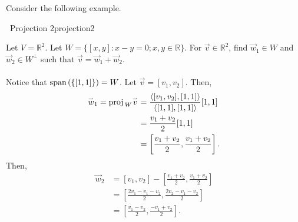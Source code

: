         \pagebreak
        \vphantom
        \\
        \\
        Consider the following example.
        \begin{example}{\Difficulty\,\Difficulty\,\,Projection 2}{projection2}

            Let \(V=\mathbb{R}^2\). Let \(W=\{[x,y]:x-y=0;x,y\in\mathbb{R}\}\). For \(\vec{v}\in\mathbb{R}^2\), find \(\vec{w}_1\in W\) and \(\vec{w}_2\in W^\perp\) such that \(\vec{v}=\vec{w}_1+\vec{w}_2\).
            \\
            \\
            Notice that \(\text{span\,}(\{[1,1]\})=W\). Let \(\vec{v}=[v_1,v_2]\). Then,
            \begin{align*}
                \overset{_{\rightharpoonup}}{w}_1=\text{proj\,}_W\overset{_{\rightharpoonup}}{v}&=\frac{\left\langle [v_1,v_2],[1,1]\right\rangle}{\left\langle [1,1],[1,1]\right\rangle}[1,1] \\
                &=\frac{v_1+v_2}{2}[1,1] \\
                &=\left[\frac{v_1+v_2}{2},\frac{v_1+v_2}{2}\right].
            \end{align*}
            Then,
            \begin{align*}
                \vec{w}_2&=[v_1,v_2]-\left[\frac{v_1+v_2}{2},\frac{v_1+v_2}{2}\right] \\
                &=\left[\frac{2v_1-v_1-v_2}{2},\frac{2v_2-v_1-v_2}{2}\right] \\
                &=\left[\frac{v_1-v_2}{2},\frac{-v_1+v_2}{2}\right].
            \end{align*}
            
        \end{example}
        \pagebreak
